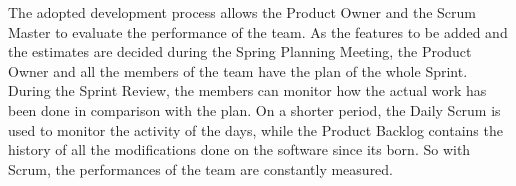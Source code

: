 		The adopted development process allows the Product Owner and the Scrum Master to evaluate the performance of the team. As the features to be added and the estimates are decided during the Spring Planning Meeting, the Product Owner and all the members of the team have the plan of the whole Sprint. During the Sprint Review, the members can monitor how the actual work has been done in comparison with the plan. On a shorter period, the Daily Scrum is used to monitor the activity of the days, while the Product Backlog contains the history of all the modifications done on the software since its born. So with Scrum, the performances of the team are constantly measured.
		
			

